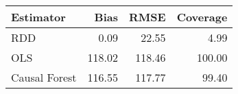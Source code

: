 \begin{table}[ht]
\centering
\begin{tabular}{lrrr}
  \hline
Estimator & Bias & RMSE & Coverage \\ 
  \hline
RDD & 0.09 & 22.55 & 4.99 \\ 
  OLS & 118.02 & 118.46 & 100.00 \\ 
  Causal Forest & 116.55 & 117.77 & 99.40 \\ 
   \hline
\end{tabular}
\end{table}
